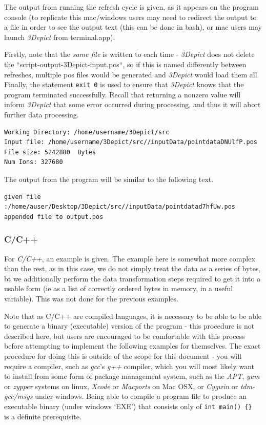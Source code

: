 \documentclass[10pt]{article}
\begin{document}
The output from running the refresh cycle is given, as it appears on the program console (to replicate this mac/windows users may need to redirect the output to a file in order to see the output text (this can be done in bash), or mac users may launch \emph{3Depict} from terminal.app).

Firstly, note that the \emph{same file} is written to each time - \emph{3Depict} does not delete the ``script-output-3Depict-input.pos``, so if this is named differently between refreshes, multiple pos files would be generated and \emph{3Depict} would load them all. Finally, the statement \texttt{exit 0} is used to ensure that \emph{3Depict} knows that the program terminated successfully. Recall that returning a nonzero value will inform \emph{3Depict} that some error occurred during processing, and thus it will abort further data processing.

\begin{verbatim}
Working Directory: /home/username/3Depict/src
Input file: /home/username/3Depict/src//inputData/pointdataDNUlfP.pos
File size: 5242880  Bytes
Num Ions: 327680
\end{verbatim}

The output from the program will be similar to the following text.
\begin{verbatim}
given file :/home/auser/Desktop/3Depict/src//inputData/pointdatad7hfUw.pos
appended file to output.pos
\end{verbatim}

\subsubsection{C/C++}
For \emph{C/C++}, an example is given. The example here is somewhat more complex than the rest, as in this case, we do not simply treat the data as a series of bytes, bt we additionally perform the data transformation steps required to get it into a usable form (ie as a list of correctly ordered bytes in memory, in a useful variable). This was not done for the previous examples.

Note that as C/C++ are compiled languages, it is necessary to be able to be able to generate a binary (executable) version of the program - this procedure is not described here, but users are encouraged to be comfortable with this process before attempting to implement the following examples for themselves. The exact procedure for doing this is outside of the scope for this document - you will require a compiler, such as \emph{gcc}'s \emph{g++} compiler, which you will most likely want to install from some form of package management system, such as the \emph{APT}, \emph{yum} or \emph{zypper} systems on linux, \emph{Xcode} or \emph{Macports} on Mac OSX, or \emph{Cygwin} or \emph{tdm-gcc/msys} under windows. Being able to compile a program file to produce an executable binary (under windows `EXE') that consists only of \texttt{int main() \{\} } is a definite prerequisite.
\end{document}
